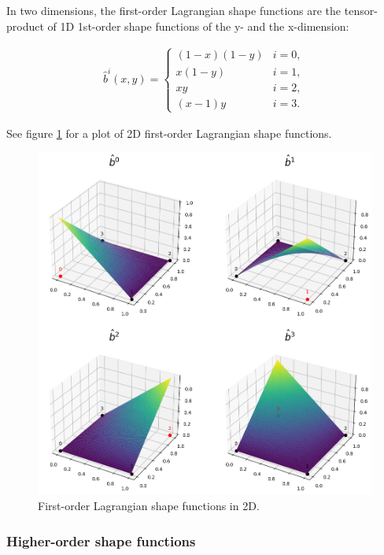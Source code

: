 In two dimensions, the first-order Lagrangian shape functions are the tensor-product
of 1D 1st-order shape functions of the y- and the x-dimension:

\begin{align}
    \hat{b}^i(x, y) = \begin{cases}
                          (1-x)(1-y) & i=0, \\
                          x(1-y)     & i=1, \\
                          xy         & i=2, \\
                          (x-1)y     & i=3.
                      \end{cases}
\end{align}

See figure \ref{fig:lagrange_1st_2d} for a plot of 2D first-order Lagrangian shape functions.

\begin{figure}[h]
    \centering
    \includegraphics[width=\hsize-2cm]{pictures/lagrange_1st_basis_2d.png}
    \caption{First-order Lagrangian shape functions in 2D.}
    \label{fig:lagrange_1st_2d}
\end{figure}

\subsubsection{Higher-order shape functions}

